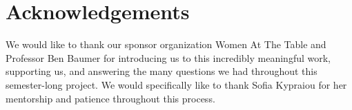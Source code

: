 \documentclass[water,article,submit,moreauthors,pdftex]{mdpi}
\begin{document}
\hypertarget{acknowledgements}{%
\section{Acknowledgements}\label{acknowledgements}}

We would like to thank our sponsor organization Women At The Table and
Professor Ben Baumer for introducing us to this incredibly meaningful
work, supporting us, and answering the many questions we had throughout
this semester-long project. We would specifically like to thank Sofia
Kypraiou for her mentorship and patience throughout this process.

%

\vspace{6pt}








\end{document}

